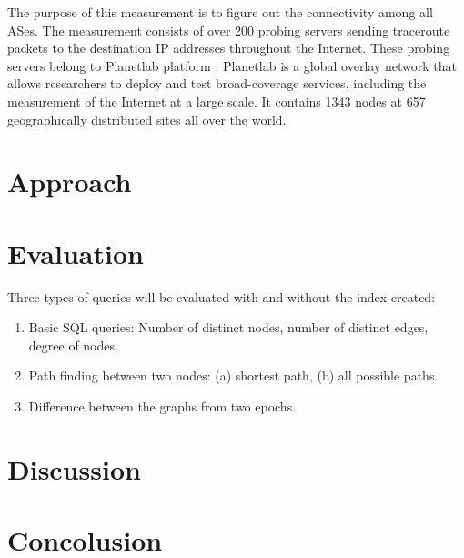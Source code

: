 \documentclass[letterpaper,twocolumn,10pt]{article}
\begin{document}

The purpose of this measurement is to figure out the connectivity among all ASes. The measurement consists of over 200 probing servers sending traceroute packets to the destination IP addresses throughout the Internet. These probing servers belong to Planetlab platform \cite{madhyastha2006iplane}. Planetlab is a global overlay network that allows researchers to deploy and test broad-coverage services, including the measurement of the Internet at a large scale. It contains 1343 nodes at 657 geographically distributed sites all over the world. 


\section{Approach}

\section{Evaluation}
Three types of queries will be evaluated with and without the index created:
\begin{enumerate}
\item Basic SQL queries: Number of distinct nodes, number of distinct edges, degree of nodes.
\item Path finding between two nodes: (a) shortest path, (b) all possible paths.
\item Difference between the graphs from two epochs.
\end{enumerate}


\section{Discussion}

\section{Concolusion}


{
}
\end{document}
